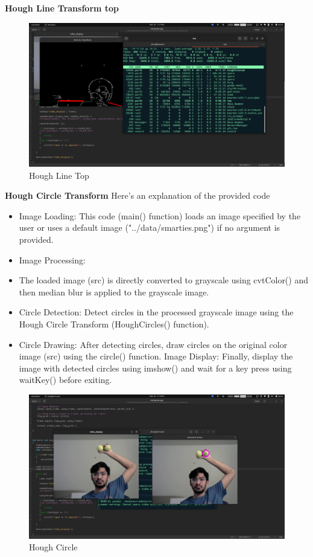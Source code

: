\documentclass[a4paper,11pt]{article}%
\newenvironment{qanda}{\setlength{\parindent}{0pt}}{\bigskip}
\begin{document}
\begin{qanda}
\begin{enumerate}
\textbf{Hough Line Transform top}
\begin{figure}[H]
	\centering
	\includegraphics[scale=0.25]{figures/htop.png}
	\caption{Hough Line Top}
\end{figure}




\textbf{Hough Circle Transform}
Here's an explanation of the provided code
\begin{itemize}
	\item Image Loading:
	This code (main() function) loads an image specified by the user or uses a default image
	("../data/smarties.png") if no argument is provided.
	\item Image Processing:
	\item The loaded image (src) is directly converted to grayscale using cvtColor() and then
	median blur is applied to the grayscale image.
	\item Circle Detection:
	Detect circles in the processed grayscale image using the Hough Circle Transform
	(HoughCircles() function).
	\item Circle Drawing:
	After detecting circles, draw circles on the original color image (src) using the circle()
	function.
	Image Display:
	Finally, display the image with detected circles using imshow() and wait for a key press
	using waitKey() before exiting.
\end{itemize}



\begin{figure}[H]
	\centering
	\includegraphics[scale=0.25]{figures/houghcircle.png}
	\caption{Hough Circle}
\end{figure}


\end{enumerate}
\end{qanda}
\end{document}
